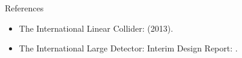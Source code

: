 \begin{block}{References}
\large
\begin{itemize}
    \item The International Linear Collider:
        \href{https://linearcollider.org/technical-design-report/}{} (2013).
    \item The International Large Detector: Interim Design Report:
        \href{https://arxiv.org/abs/2003.01116}{}.
\end{itemize}
\end{block}
